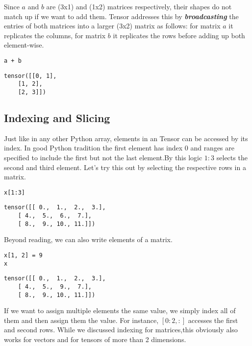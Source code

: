 \documentclass[]{article}
\begin{document}
Since $ a $ and $ b $ are (3x1) and (1x2) matrices respectively, their shapes do not match up if we want to add them. Tensor addresses this by \textbf{\textit{broadcasting}} the entries of both matrices into a larger (3x2) matrix as follows: for matrix $ a $ it replicates the columns, for matrix $ b $ it replicates the rows before adding up both element-wise.

\begin{verbatim}
a + b
\end{verbatim}

\begin{verbatim}
tensor([[0, 1],
	[1, 2],
	[2, 3]])
\end{verbatim}

\subsection{Indexing and Slicing}

Just like in any other Python array, elements in an Tensor can be accessed by its index. In good Python tradition the first element has index 0 and ranges are specified to include the first but not the last element.By this logic $ 1:3 $ selects the second and third element. Let’s try this out by selecting the respective rows in a matrix.

\begin{verbatim}
x[1:3]
\end{verbatim}

\begin{verbatim}
tensor([[ 0.,  1.,  2.,  3.],
	[ 4.,  5.,  6.,  7.],
	[ 8.,  9., 10., 11.]])
\end{verbatim}

Beyond reading, we can also write elements of a matrix.

\begin{verbatim}
x[1, 2] = 9
x
\end{verbatim}

\begin{verbatim}
tensor([[ 0.,  1.,  2.,  3.],
	[ 4.,  5.,  9.,  7.],
	[ 8.,  9., 10., 11.]])
\end{verbatim}

If we want to assign multiple elements the same value, we simply index all of them and then assign them the value. For instance, $ [0:2, :] $ accesses the first and second rows. While we discussed indexing for matrices,this obviously also works for vectors and for tensors of more than 2 dimensions.
\end{document}
